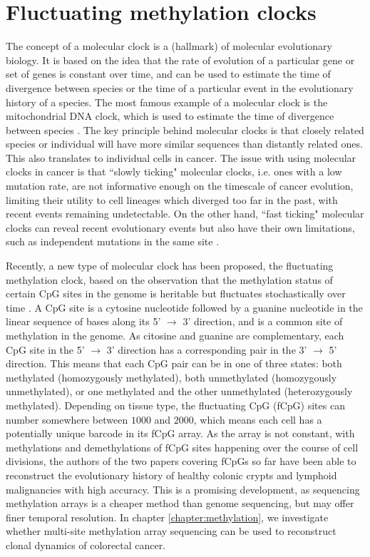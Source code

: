 \section{Fluctuating methylation clocks}
The concept of a molecular clock is a (hallmark) of molecular evolutionary biology. It is based on the idea that the
rate of evolution of a particular gene or set of genes is constant over time, and can be used to estimate
the time of divergence between species or the time of a particular event in the evolutionary history of a
species. The most famous example of a molecular clock is the mitochondrial DNA clock, which is used to
estimate the time of divergence between species \cite{hasegawa_dating_1985}. The key principle behind molecular
clocks is that closely related species or individual will have more similar sequences than distantly related
ones. This also translates to individual cells in cancer. The issue with using molecular clocks in cancer
is that ``slowly ticking" molecular clocks, i.e. ones with a low mutation rate, are not informative enough
on the timescale of cancer evolution, limiting their utility to cell lineages which diverged too far in the past,
with recent events remaining undetectable. On the other hand, ``fast ticking" molecular clocks can
reveal recent evolutionary events but also have their own limitations, such as independent mutations in the
same site \cite{kuipers_single-cell_2017}. \par
Recently, a new type of molecular clock has been proposed, the fluctuating methylation clock, based on the
observation that the methylation status of certain CpG sites in the genome is heritable but fluctuates
stochastically over time \cite{gabbutt_fluctuating_2022, gabbutt_evolutionary_2023}. A CpG site is a
cytosine nucleotide followed by a guanine nucleotide in the linear sequence of bases along its
5' $\rightarrow$ 3' direction, and is a common site of methylation in the genome. As citosine and guanine
are complementary, each CpG site in the 5' $\rightarrow$ 3' direction has a corresponding pair in the
3' $\rightarrow$ 5' direction. This means that each CpG pair can be in one of three states: both
methylated (homozygously methylated), both unmethylated (homozygously unmethylated), or one methylated
and the other unmethylated (heterozygously methylated). Depending on tissue type, the fluctuating CpG
(fCpG) sites can number somewhere between $1000$ and $2000$, which means each cell has a potentially
unique barcode in its fCpG array. As the array is not constant, with methylations and demethylations
of fCpG sites happening over the course of cell divisions, the authors of the two papers covering fCpGs
so far have been able to reconstruct the evolutionary history of healthy colonic crypts and lymphoid
malignancies with high accuracy. This is a promising development, as sequencing methylation arrays
is a cheaper method than genome sequencing, but may offer finer temporal resolution. In chapter
\ref{chapter:methylation}, we investigate whether multi-site methylation array sequencing can be used
to reconstruct clonal dynamics of colorectal cancer.


